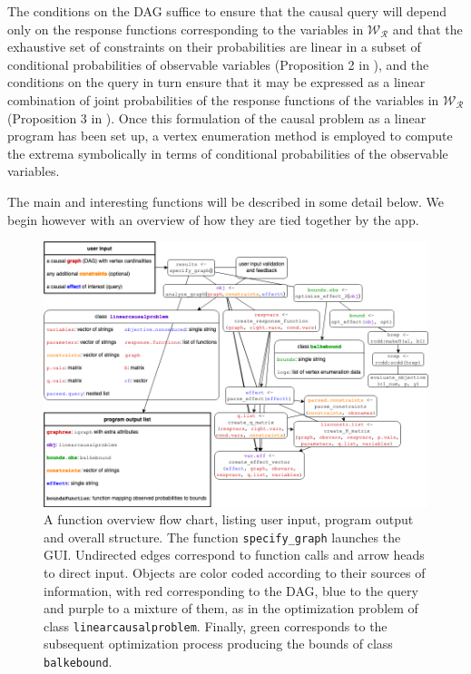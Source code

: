 The conditions on the DAG suffice to ensure that the causal query will depend only on the response functions corresponding to the variables in \(\mathcal{W}_\mathcal{R}\) and that the exhaustive set of constraints on their probabilities are linear in a subset of conditional probabilities of observable variables (Proposition 2 in \citet{generalcausalbounds}), and the conditions on the query in turn ensure that it may be expressed as a linear combination of joint probabilities of the response functions of the variables in \(\mathcal{W}_\mathcal{R}\) (Proposition 3 in \citet{generalcausalbounds}).
Once this formulation of the causal problem as a linear program has been set up, a vertex enumeration method is employed to compute the extrema symbolically in terms of conditional probabilities of the observable variables.

The main and interesting functions will be described in some detail below. We begin however with an overview of how they are tied together by the  app.



\begin{figure}

{\centering \includegraphics[width=1\linewidth]{figures/causaloptimDiagramTall.drawio} 

}

\caption{A function overview flow chart, listing user input, program output and overall structure. The function \texttt{specify\_graph} launches the GUI. Undirected edges correspond to function calls and arrow heads to direct input. Objects are color coded according to their sources of information, with \textcolor[HTML]{CC0000}{red} corresponding to the \textcolor[HTML]{CC0000}{DAG}, \textcolor[HTML]{0000FF}{blue} to the \textcolor[HTML]{0000FF}{query} and \textcolor[HTML]{6600CC}{purple} to a mixture of them, as in the optimization \textcolor[HTML]{6600CC}{problem} of class \texttt{linearcausalproblem}. Finally, \textcolor[HTML]{009900}{green} corresponds to the subsequent optimization process producing the \textcolor[HTML]{009900}{bounds} of class \texttt{balkebound}.}\label{fig:Overview}
\end{figure}

